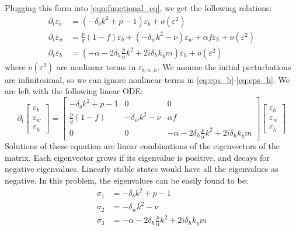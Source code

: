 \documentclass{article}
\numberwithin{equation}{section}
\begin{document}
Plugging this form into \ref{eqn:functional_eq}, we get the following relations:
\begin{align}
    \partial_t \varepsilon_b & = (-\delta_b k^2+p - 1)\varepsilon_b + o(\varepsilon^2)   \label{eq:eps_b}                                   \\
    \partial_t \varepsilon_w & = \frac{p}{q}(1-f)\varepsilon_b + (-\delta_wk^2-\nu)\varepsilon_w +\alpha f\varepsilon_h + o(\varepsilon^2)  \\
    \partial_t \varepsilon_h & = (-\alpha -2\delta_h \frac{p}{\alpha} k^2 +2i\delta_hk_ym) \varepsilon_h + o(\varepsilon^2)\label{eq:eps_h}
\end{align}
where $o(\varepsilon^2)$ are nonlinear terms in $\varepsilon_{b,w,h}$. We assume the initial perturbations are infinitesimal, so we can ignore nonlinear terms in \ref{eq:eps_b}-\ref{eq:eps_h}. We are left with the following linear ODE:
\begin{equation}
    \partial_t \begin{bmatrix}
        \varepsilon_b \\ \varepsilon_w \\ \varepsilon_h
    \end{bmatrix} = \begin{bmatrix}
        -\delta_b k^2+p - 1 & 0                & 0                                                       \\
        \frac{p}{q}(1-f)    & -\delta_wk^2-\nu & \alpha f                                                \\
        0                   & 0                & -\alpha -2\delta_h \frac{p}{\alpha} k^2 +2i\delta_hk_ym
    \end{bmatrix} \begin{bmatrix}
        \varepsilon_b \\ \varepsilon_w \\ \varepsilon_h
    \end{bmatrix}
\end{equation}
Solutions of these equation are linear combinations of the eigenvectors of the matrix. Each eigenvector grows if its eigenvalue is positive, and decays for negative eigenvalues. Linearly stable states would have all the eigenvalues as  negative. In this problem, the eigenvalues can be easily found to be:
\begin{align}
    \sigma_1 & = -\delta_b k^2+p - 1 \label{eq:sigma1}                   \\
    \sigma_2 & = -\delta_w k^2 -\nu                                      \\
    \sigma_3 & = -\alpha -2\delta_h \frac{p}{\alpha} k^2 +2i\delta_hk_ym
\end{align}
\end{document}
